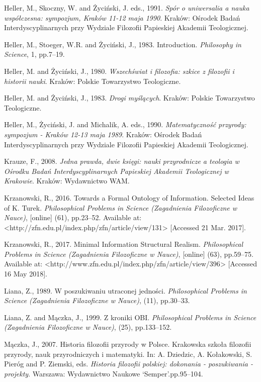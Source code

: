 \documentclass[a4paper]{article}
\begin{document}
Heller, M., Skoczny, W. and Życiński, J. eds., 1991. \textit{Spór o uniwersalia a nauka współczesna: sympozjum, Kraków
11-12 maja 1990}. Kraków: Ośrodek Badań Interdyscyplinarnych przy Wydziale Filozofii Papieskiej Akademii Teologicznej.

Heller, M., Stoeger, W.R. and Życiński, J., 1983. Introduction. \textit{Philosophy in Science}, 1, pp.7–19.

Heller, M. and Życiński, J., 1980. \textit{Wszechświat i filozofia: szkice z filozofii i historii nauki}. Kraków:
Polskie Towarzystwo Teologiczne.

Heller, M. and Życiński, J., 1983. \textit{Drogi myślących}. Kraków: Polskie Towarzystwo Teologiczne.

Heller, M., Życiński, J. and Michalik, A. eds., 1990. \textit{Matematyczność przyrody: sympozjum - Kraków 12-13 maja
1989}. Kraków: Ośrodek Badań Interdyscyplinarnych przy Wydziale Filozofii Papieskiej Akademii Teologicznej.

Krauze, F., 2008. \textit{Jedna prawda, dwie księgi: nauki przyrodnicze a teologia w Ośrodku Badań Interdyscyplinarnych
Papieskiej Akademii Teologicznej w Krakowie}. Kraków: Wydawnictwo WAM.

Krzanowski, R., 2016. Towards a Formal Ontology of Information. Selected Ideas of K. Turek. \textit{Philosophical
Problems in Science (Zagadnienia Filozoficzne w Nauce)}, [online] (61), pp.23–52. Available at:
{\textless}http://zfn.edu.pl/index.php/zfn/article/view/131{\textgreater} [Accessed 21 Mar. 2017].

Krzanowski, R., 2017. Minimal Information Structural Realism. \textit{Philosophical Problems in Science (Zagadnienia
Filozoficzne w Nauce)}, [online] (63), pp.59–75. Available at:
{\textless}http://www.zfn.edu.pl/index.php/zfn/article/view/396{\textgreater} [Accessed 16 May 2018].

Liana, Z., 1989. W poszukiwaniu utraconej jedności. \textit{Philosophical Problems in Science (Zagadnienia Filozoficzne
w Nauce)}, (11), pp.30–33.

Liana, Z. and Mączka, J., 1999. Z kroniki OBI. \textit{Philosophical Problems in Science (Zagadnienia Filozoficzne w
Nauce)}, (25), pp.133–152.

Mączka, J., 2007. Historia filozofii przyrody w Polsce. Krakowska szkoła filozofii przyrody, nauk przyrodniczych i
matematyki. In: A. Dziedzic, A. Kołakowski, S. Pieróg and P. Ziemski, eds. \textit{Historia filozofii polskiej:
dokonania - poszukiwania - projekty}. Warszawa: Wydawnictwo Naukowe ‘Semper’.pp.95–104.
\end{document}
